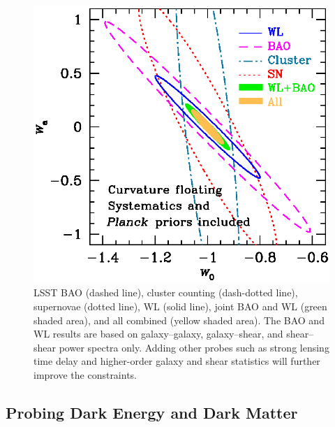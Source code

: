 \documentclass{emulateapj}
\begin{document}
\begin{figure}
\includegraphics[width=1.0\hsize,clip]{cswb.ps}
\caption{
LSST BAO (dashed line), cluster counting (dash-dotted line), 
supernovae (dotted line), WL (solid line), joint BAO and WL 
(green shaded area), and all combined (yellow shaded area).
The BAO and WL results are based on galaxy--galaxy, galaxy--shear,
and shear--shear power spectra only. 
Adding other probes such as strong lensing time delay
and higher-order galaxy and shear statistics will further improve 
the constraints.} 
\label{Fig:DEellipses}
\end{figure}


\vskip 0.3in
\subsection{ Probing Dark Energy and Dark Matter }
\end{document}
